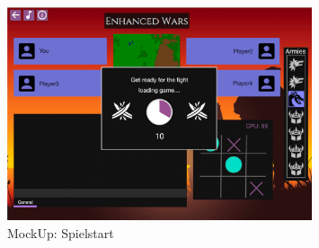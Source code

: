 \documentclass[12pt, titlepage]{scrartcl}
\begin{document}
			    \begin{figure}[H] 
    				\centering
    				\includegraphics[width=0.8\textwidth]{images/mockUps/StartGame.png}
    				\caption{MockUp: Spielstart}
    				\label{Game_Start}
			    \end{figure}
\end{document}
